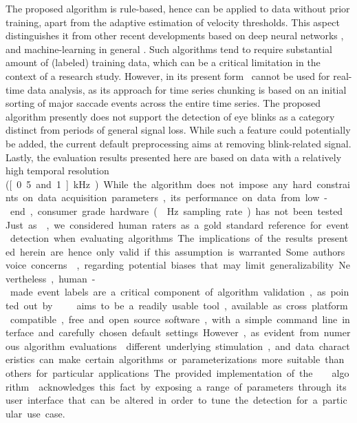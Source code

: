 The proposed algorithm is rule-based, hence can be applied to data without
prior training, apart from the adaptive estimation of velocity thresholds.
This aspect distinguishes it from other recent developments based on deep
neural networks \citep{Startsev2018}, and machine-learning in general
\citep{Zemblys2018}. Such algorithms tend to require substantial amount of
(labeled) training data, which can be a critical limitation in the context of a
research study. However, in its present form \remodnav\ cannot be used for
real-time data analysis, as its approach for time series chunking is based
on an initial sorting of major saccade events across the entire time series.
The proposed algorithm presently does not support the detection of eye blinks
as a category distinct from periods of general signal loss. While such a feature
could potentially be added, the current default preprocessing aims at removing
blink-related signal. Lastly, the evaluation results presented here are based
on data with a relatively high temporal resolution (\unit[0.5 and 1]{kHz}). While
the algorithm does not impose any hard constraints on data acquisition parameters,
its performance on data from low-end, consumer grade hardware (\eg \unit[50]{Hz}
sampling rate) has not been tested.

Just as \cite{Andersson2017}, we considered human raters as a gold standard
reference for event detection when evaluating algorithms.  The implications of
the results presented herein are hence only valid if this assumption is
warranted. Some authors voice concerns \cite[\eg][]{5523936}, regarding
potential biases that may limit generalizability. Nevertheless, human-made
event labels are a critical component of algorithm validation, as pointed out
by \cite{Hooge2018}.

\remodnav\ aims to be a readily usable tool, available as cross platform
compatible, free and open source software, with a simple command line interface
and carefully chosen default settings. However, as evident from numerous
algorithm evaluations
\citep[\eg][]{Andersson2017,Larsson2013,Zemblys2018,5523936} different
underlying stimulation, and data characteristics can make certain algorithms or
parameterizations more suitable than others for particular applications. The
provided implementation of the \remodnav\ algorithm \citep{michael_hanke_2019_2651042}
acknowledges this fact by
exposing a range of parameters through its user interface that can be altered
in order to tune the detection for a particular use case.


